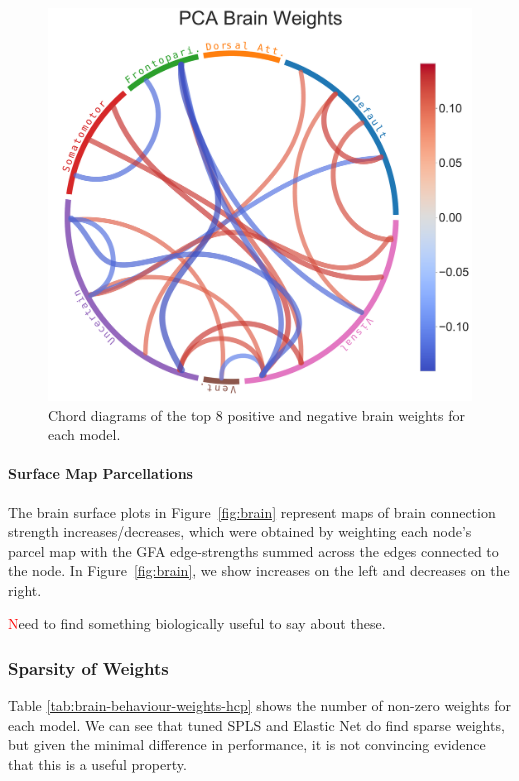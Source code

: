 \begin{figure}
\includegraphics[width=0.49\linewidth]{figures/hcp/PCA brain weights}
\caption{Chord diagrams of the top 8 positive and negative brain \gls{weights} for each model.}\label{fig:chord_weights}
\end{figure}

\paragraph{Surface Map Parcellations}
The brain surface plots in Figure~\ref{fig:brain} represent maps of brain connection strength increases/decreases, which
were obtained by weighting each node’s parcel map with the GFA edge-strengths summed across the edges
connected to the node.
In Figure~\ref{fig:brain}, we show increases on the left and decreases on the right.

\textcolor{red} Need to find something biologically useful to say about these.
%

\subsubsection{Sparsity of Weights}

Table \ref{tab:brain-behaviour-weights-hcp} shows the number of non-zero \gls{weights} for each model.
We can see that tuned SPLS and Elastic Net do find sparse weights, but given the minimal difference in performance, it is not convincing evidence that this is a useful property.

